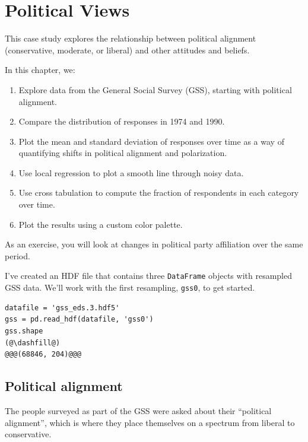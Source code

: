 \hypertarget{political-views}{%
\chapter{Political Views}\label{political-views}}

This case study explores the relationship between political alignment
(conservative, moderate, or liberal) and other attitudes and beliefs.

In this chapter, we:

\begin{enumerate}
\def\labelenumi{\arabic{enumi}.}
\item
  Explore data from the General Social Survey (GSS), starting with
  political alignment.
\item
  Compare the distribution of responses in 1974 and 1990.
\item
  Plot the mean and standard deviation of responses over time as a way
  of quantifying shifts in political alignment and polarization.
\item
  Use local regression to plot a smooth line through noisy data.
\item
  Use cross tabulation to compute the fraction of respondents in each
  category over time.
\item
  Plot the results using a custom color palette.
\end{enumerate}

As an exercise, you will look at changes in political party affiliation
over the same period.

I've created an HDF file that contains three
\passthrough{\lstinline!DataFrame!} objects with resampled GSS data.
We'll work with the first resampling, \passthrough{\lstinline!gss0!}, to
get started.

\begin{lstlisting}[]
datafile = 'gss_eds.3.hdf5'
gss = pd.read_hdf(datafile, 'gss0')
gss.shape
(@\dashfill@)
@@@(68846, 204)@@@
\end{lstlisting}

\hypertarget{political-alignment}{%
\section{Political alignment}\label{political-alignment}}

The people surveyed as part of the GSS were asked about their
``political alignment'', which is where they place themselves on a
spectrum from liberal to conservative.


